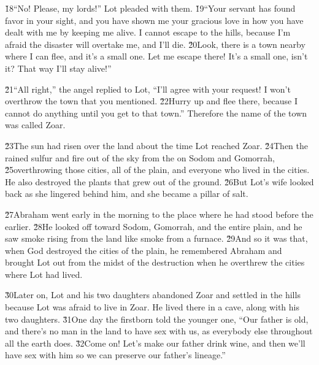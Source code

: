 \v{18}``No! Please, my lords!'' Lot pleaded with them. \v{19}``Your servant has found favor in your sight, and you have shown me your gracious love in how you have dealt with me by keeping me alive. I cannot escape to the hills, because I'm afraid the disaster will overtake me, and I'll die. \v{20}Look, there is a town nearby where I can flee, and it's a small one. Let me escape there! It's a small one, isn't it? That way I'll stay alive!''

\v{21}``All right,'' the angel replied to Lot, ``I'll agree with your request! I won't overthrow the town that you mentioned. \v{22}Hurry up and flee there, because I cannot do anything until you get to that town.'' Therefore the name of the town was called Zoar.

\v{23}The sun had risen over the land about the time Lot reached Zoar. \v{24}Then the  rained sulfur and fire out of the sky from the  on Sodom and Gomorrah, \v{25}overthrowing those cities, all of the plain, and everyone who lived in the cities. He also destroyed the plants that grew out of the ground. \v{26}But Lot's wife looked back as she lingered behind him, and she became a pillar of salt.

\v{27}Abraham went early in the morning to the place where he had stood before the  earlier. \v{28}He looked off toward Sodom, Gomorrah, and the entire plain, and he saw smoke rising from the land like smoke from a furnace. \v{29}And so it was that, when God destroyed the cities of the plain, he remembered Abraham and brought Lot out from the midst of the destruction when he overthrew the cities where Lot had lived.

\v{30}Later on, Lot and his two daughters abandoned Zoar and settled in the hills because Lot was afraid to live in Zoar. He lived there in a cave, along with his two daughters. \v{31}One day the firstborn told the younger one, ``Our father is old, and there's no man in the land to have sex with us, as everybody else throughout all the earth does. \v{32}Come on! Let's make our father drink wine, and then we'll have sex with him so we can preserve our father's lineage.''

